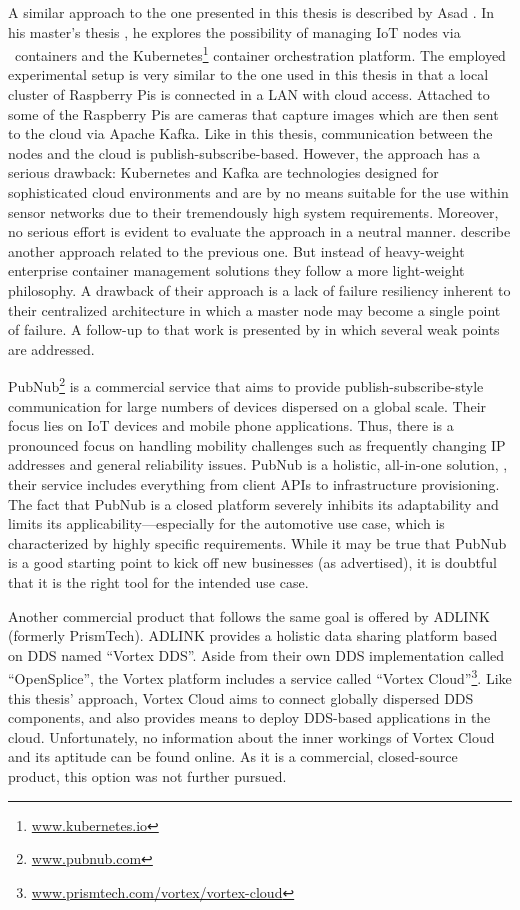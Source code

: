A similar approach to the one presented in this thesis is described by Asad \citeauthor*{javed2016container}. In his master's thesis \cite{javed2016container}, he explores the possibility of managing IoT nodes via \docker\ containers and the Kubernetes\footnote{\url{www.kubernetes.io}} container orchestration platform. The employed experimental setup is very similar to the one used in this thesis in that a local cluster of Raspberry Pis is connected in a LAN with cloud access. Attached to some of the Raspberry Pis are cameras that capture images which are then sent to the cloud via Apache Kafka. Like in this thesis, communication between the nodes and the cloud is publish-subscribe-based. However, the approach has a serious drawback: Kubernetes and Kafka are technologies designed for sophisticated cloud environments and are by no means suitable for the use within sensor networks due to their tremendously high system requirements. Moreover, no serious effort is evident to evaluate the approach in a neutral manner.
\citeauthor*{grossmann2016hypriot} \cite{grossmann2016hypriot} describe another approach related to the previous one. But instead of heavy-weight enterprise container management solutions they follow a more light-weight philosophy. A drawback of their approach is a lack of failure resiliency inherent to their centralized architecture in which a master node may become a single point of failure. A follow-up to that work is presented by \citeauthor*{celesti2017watchdog} \cite{celesti2017watchdog} in which several weak points are addressed.

PubNub\footnote{\url{www.pubnub.com}} is a commercial service that aims to provide publish-subscribe-style communication for large numbers of devices dispersed on a global scale. Their focus lies on IoT devices and mobile phone applications. Thus, there is a pronounced focus on handling mobility challenges such as frequently changing IP addresses and general reliability issues. PubNub is a holistic, all-in-one solution, \ie , their service includes everything from client APIs to infrastructure provisioning. The fact that \mbox{PubNub} is a closed platform severely inhibits its adaptability and limits its applicability---especially for the automotive use case, which is characterized by highly specific requirements. While it may be true that PubNub is a good starting point to kick off new businesses (as advertised), it is doubtful that it is the right tool for the intended use case.

Another commercial product that follows the same goal is offered by ADLINK (formerly PrismTech). ADLINK provides a holistic data sharing platform based on DDS named ``Vortex DDS''. Aside from their own DDS implementation called ``OpenSplice'', the Vortex platform includes a service called ``Vortex Cloud''\footnote{\url{www.prismtech.com/vortex/vortex-cloud}}. Like this thesis' approach, Vortex Cloud aims to connect globally dispersed DDS components, and also provides means to deploy DDS-based applications in the cloud. Unfortunately, no information about the inner workings of Vortex Cloud and its aptitude can be found online. As it is a commercial, closed-source product, this option was not further pursued.

